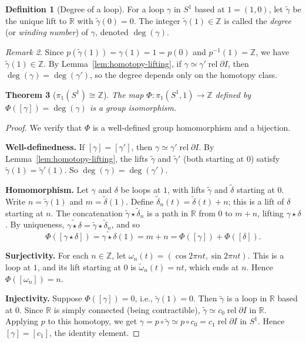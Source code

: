 \documentclass[12pt,a4paper,openany]{book}
\theoremstyle{definition}
\newtheorem{definition}{Definition}[chapter]
\theoremstyle{plain}
\newtheorem{theorem}[definition]{Theorem}
\theoremstyle{remark}
\newtheorem{remark}[definition]{Remark}
\newcommand{\Z}{\mathbb{Z}}
\newcommand{\R}{\mathbb{R}}
\newcommand{\rel}{\operatorname{rel}}
\begin{document}
\begin{definition}[Degree of a loop]\label{def:degree-loop}
For a loop $\gamma$ in $S^1$ based at $1 = (1,0)$, let $\tilde{\gamma}$ be the
unique lift to $\R$ with $\tilde{\gamma}(0) = 0$. The integer $\tilde{\gamma}(1)
\in \Z$ is called the \emph{degree} (or \emph{winding
number}) of $\gamma$, denoted $\deg(\gamma)$.
\end{definition}

\begin{remark}\label{rem:degree-well-defined}
Since $p(\tilde{\gamma}(1)) = \gamma(1) = 1 = p(0)$ and $p^{-1}(1) = \Z$, we
have $\tilde{\gamma}(1) \in \Z$. By Lemma~\ref{lem:homotopy-lifting}, if
$\gamma \simeq \gamma' \rel{\partial I}$, then $\deg(\gamma) = \deg(\gamma')$,
so the degree depends only on the homotopy class.
\end{remark}

\begin{theorem}[$\pi_1(S^1) \cong \Z$]\label{thm:pi1-S1}
The map $\Phi \colon \pi_1(S^1, 1) \to \Z$ defined by $\Phi([\gamma]) =
\deg(\gamma)$ is a group isomorphism.
\end{theorem}

\begin{proof}
We verify that $\Phi$ is a well-defined group homomorphism and a bijection.

\textbf{Well-definedness.} If $[\gamma] = [\gamma']$, then $\gamma \simeq
\gamma' \rel{\partial I}$. By Lemma~\ref{lem:homotopy-lifting}, the lifts
$\tilde{\gamma}$ and $\tilde{\gamma}'$ (both starting at $0$) satisfy
$\tilde{\gamma}(1) = \tilde{\gamma}'(1)$. So $\deg(\gamma) = \deg(\gamma')$.

\textbf{Homomorphism.} Let $\gamma$ and $\delta$ be loops at $1$, with lifts
$\tilde{\gamma}$ and $\tilde{\delta}$ starting at $0$. Write $n =
\tilde{\gamma}(1)$ and $m = \tilde{\delta}(1)$. Define $\tilde{\delta}_n(t) =
\tilde{\delta}(t) + n$; this is a lift of $\delta$ starting at $n$. The
concatenation $\tilde{\gamma} \star \tilde{\delta}_n$ is a path in $\R$ from $0$
to $m + n$, lifting $\gamma \star \delta$. By uniqueness, $\widetilde{\gamma
\star \delta} = \tilde{\gamma} \star \tilde{\delta}_n$, and so
\[
  \Phi([\gamma \star \delta]) = \widetilde{\gamma \star \delta}(1) = m + n = \Phi([\gamma]) + \Phi([\delta]).
\]

\textbf{Surjectivity.} For each $n \in \Z$, let $\omega_n(t) = (\cos 2\pi nt,
\sin 2\pi nt)$. This is a loop at $1$, and its lift starting at $0$ is
$\tilde{\omega}_n(t) = nt$, which ends at $n$. Hence $\Phi([\omega_n]) = n$.

\textbf{Injectivity.} Suppose $\Phi([\gamma]) = 0$, i.e., $\tilde{\gamma}(1) =
0$. Then $\tilde{\gamma}$ is a loop in $\R$ based at $0$. Since $\R$ is simply
connected (being contractible), $\tilde{\gamma} \simeq c_0 \rel{\partial I}$ in
$\R$. Applying $p$ to this homotopy, we get $\gamma = p \circ \tilde{\gamma}
\simeq p \circ c_0 = c_1 \rel{\partial I}$ in $S^1$. Hence $[\gamma] =
[c_1]$, the identity element.
\end{proof}
\end{document}
